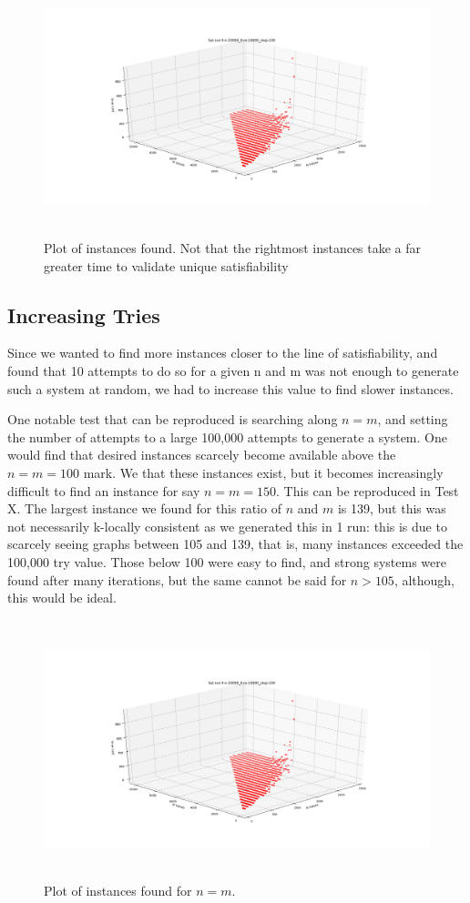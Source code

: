 \begin{figure}[htbp!] 
	\centering
	\includegraphics[height=75mm]{Figs/system_search_time}
	\caption{Plot of instances found. Not that the rightmost instances take a far greater time to validate unique satisfiability}
	\label{fig:sb}
\end{figure}

\subsection{Increasing Tries}
Since we wanted to find more instances closer to the line of satisfiability, and found that 10 attempts to do so for a given n and m was not enough to generate such a system at random, we had to increase this value to find slower instances.
\par
One notable test that can be reproduced is searching along $n=m$, and setting the number of attempts to a large 100,000 attempts to generate a system. One would find that desired instances scarcely become available above the $n=m=100$ mark. We that these instances exist, but it becomes increasingly difficult to find an instance for say $n=m=150$. This can be reproduced in Test X. The largest instance we found for this ratio of $n$ and $m$ is 139, but this was not necessarily k-locally consistent as we generated this in 1 run: this is due to scarcely seeing graphs between 105 and 139, that is, many instances exceeded the 100,000 try value. Those below 100 were easy to find, and strong systems were found after many iterations, but the same cannot be said for $n>105$, although, this would be ideal.
\begin{figure}[htbp!] 
	\centering
	\includegraphics[height=75mm]{Figs/system_search_time}
	\caption{Plot of instances found for $n=m$.}
\end{figure}
 
